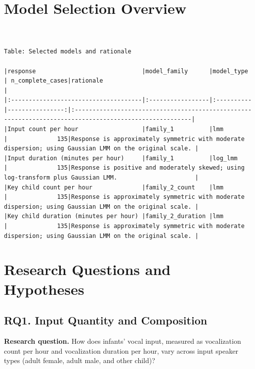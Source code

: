 \documentclass[
  letterpaper,
  DIV=11,
  numbers=noendperiod]{scrartcl}
\begin{document}
\hypertarget{model-selection-overview}{%
\section{Model Selection Overview}\label{model-selection-overview}}

\begin{verbatim}


Table: Selected models and rationale

|response                              |model_family      |model_type | n_complete_cases|rationale                                                                                               |
|:-------------------------------------|:-----------------|:----------|----------------:|:-------------------------------------------------------------------------------------------------------|
|Input count per hour                  |family_1          |lmm        |              135|Response is approximately symmetric with moderate dispersion; using Gaussian LMM on the original scale. |
|Input duration (minutes per hour)     |family_1          |log_lmm    |              135|Response is positive and moderately skewed; using log-transform plus Gaussian LMM.                      |
|Key child count per hour              |family_2_count    |lmm        |              135|Response is approximately symmetric with moderate dispersion; using Gaussian LMM on the original scale. |
|Key child duration (minutes per hour) |family_2_duration |lmm        |              135|Response is approximately symmetric with moderate dispersion; using Gaussian LMM on the original scale. |
\end{verbatim}

\hypertarget{research-questions-and-hypotheses}{%
\section{Research Questions and
Hypotheses}\label{research-questions-and-hypotheses}}

\hypertarget{rq1.-input-quantity-and-composition}{%
\subsection{RQ1. Input Quantity and
Composition}\label{rq1.-input-quantity-and-composition}}

\textbf{Research question.} How does infants' vocal input, measured as
vocalization count per hour and vocalization duration per hour, vary
across input speaker types (adult female, adult male, and other child)?
\end{document}
